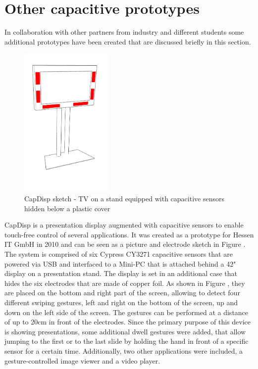 \section{Other capacitive prototypes}
In collaboration with other partners from industry and different students some additional prototypes have been created that are discussed briefly in this section. 

\begin{figure}[h]
\centering
\includegraphics[width=0.4\textwidth]{images/other_proto_capdisp}
\caption{CapDisp sketch - TV on a stand equipped with capacitive sensors hidden below a plastic cover}
\label{fig:other_proto_capdisp}
\end{figure}

CapDisp is a presentation display augmented with capacitive sensors to enable touch-free control of several applications. It was created as a prototype for Hessen IT GmbH in 2010 and can be seen as a picture and electrode sketch in Figure . The system is comprised of six Cypress CY3271 capacitive sensors that are powered via USB and interfaced to a Mini-PC that is attached behind a 42" display on a presentation stand. The display is set in an additional case that hides the six electrodes that are made of copper foil. As shown in Figure , they are placed on the bottom and right part of the screen, allowing to detect four different swiping gestures, left and right on the bottom of the screen, up and down on the left side of the screen. The gestures can be performed at a distance of up to 20cm in front of the electrodes. Since the primary purpose of this device is showing presentations, some additional dwell gestures were added, that allow jumping to the first or to the last slide by holding the hand in front of a specific sensor for a certain time. Additionally, two other applications were included, a gesture-controlled image viewer and a video player.

